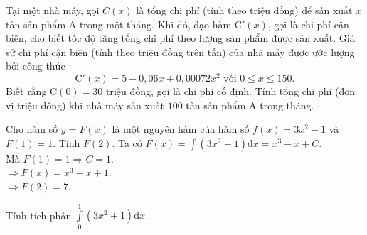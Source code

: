 \begin{ex}%
	Tại một nhà máy, gọi $C(x)$ là tổng chi phí (tính theo triệu đồng) để sản xuất $x$ tấn sản phẩm $\mathrm{A}$ trong một tháng. Khi đó, đạo hàm $\mathrm{C}'(x)$, gọi là chi phí cận biên, cho biết tốc độ tăng tổng chi phí theo lượng sản phẩm được sản xuất. Giả sử chi phí cận biên (tính theo triệu đồng trên tấn) của nhà máy được ước lượng bởi công thức
	$$
	\mathrm{C}'(x)=5-0{,}06 x+0{,}00072 x^2 \text{ với } 0 \leq x \leq 150.
	$$
	Biết rằng $\mathrm{C}(0)=30$ triệu đồng, gọi là chi phí cố định. Tính tổng chi phí (đơn vị triệu đồng) khi nhà máy sản xuất $100$ tấn sản phẩm A trong tháng.
\end{ex}

\begin{ex}%
	Cho hàm số $y=F(x)$ là một nguyên hàm của hàm số $f(x) = 3x^2-1$ và $F(1) = 1$. Tính $F(2)$.
	\loigiai
	{
		Ta có $F(x) = \displaystyle \int  \left(3x^2-1\right) \mathrm{d}x = x^3 - x + C$.\\
		Mà $F(1) = 1 \Rightarrow C = 1$.\\
		$\Rightarrow F(x) = x^3 - x + 1$.\\
		$\Rightarrow F(2) = 7$.
	}
\end{ex}

\begin{ex}%
	Tính tích phân $\displaystyle\int\limits_{0}^{1} \left(3x^2 + 1\right) \mathrm{d}x$.
\end{ex}

